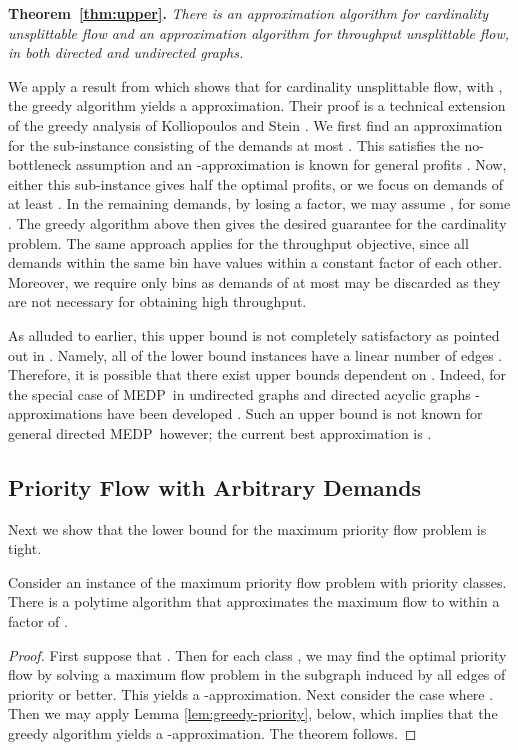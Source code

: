 \documentclass[12pt]{article}
\newcommand{\qed}{}
\newcommand{\medp}{{\sc MEDP}}
\begin{document}
{{\noindent\bf Theorem~\ref{thm:upper}.} \itshape
There is an  approximation algorithm
for cardinality unsplittable flow and an  approximation algorithm
for throughput unsplittable flow, in both directed and undirected graphs. \\
}

We apply a result from \cite{guruswami2003near} which shows that for cardinality
unsplittable flow, with ,
the greedy algorithm yields a  approximation.  Their proof is a technical extension
of the greedy analysis of Kolliopoulos and Stein \cite{kolliopoulos2004approximating}.
We first find an approximation for the sub-instance consisting of the demands at most . This
satisfies the no-bottleneck assumption and an -approximation is known for general profits \cite{baveja2000approximation}.
Now, either this sub-instance gives half the optimal profits, or we focus on demands of at least .
In the remaining demands, by losing a  factor, we may assume , for some .
The greedy algorithm above then gives the desired guarantee for the cardinality problem.
The same approach applies for the throughput objective, since all demands within the same bin
have values within a constant factor of each other. Moreover, we require only  bins
as demands of  at most  may be discarded as they are not necessary for
obtaining high throughput.
\qed








\vspace*{.3cm}
As alluded to earlier, this  upper bound  is not completely satisfactory as pointed out in \cite{chekuri2003edge}. Namely,
all of the lower bound instances have a linear number of edges .
Therefore, it is possible that there exist upper bounds dependent on .
Indeed, for the special case of \medp \ in undirected graphs and directed acyclic graphs
-approximations have been developed  \cite{chekuri2006n,nguyen2007disjoint}.
Such an upper bound is
not known for general directed \medp \ however;
the current best approximation is .



\subsection{Priority Flow with Arbitrary Demands}\label{sec:upper-priority}
Next we show that the lower bound for the maximum priority flow problem is tight.
\begin{thm}
Consider an instance of the maximum priority flow problem with  priority classes.
There is a polytime algorithm that approximates the maximum flow to within a factor of .
\end{thm}
\begin{proof}
 First suppose that . Then for each class ,
we may find the optimal priority flow by solving a maximum flow problem in the subgraph induced by all edges of
priority  or better. This yields a -approximation.
Next consider the case where . Then we may apply Lemma \ref{lem:greedy-priority}, below,
which implies that the greedy algorithm yields
a -approximation. The theorem follows.
\qed
\end{proof}
\end{document}
